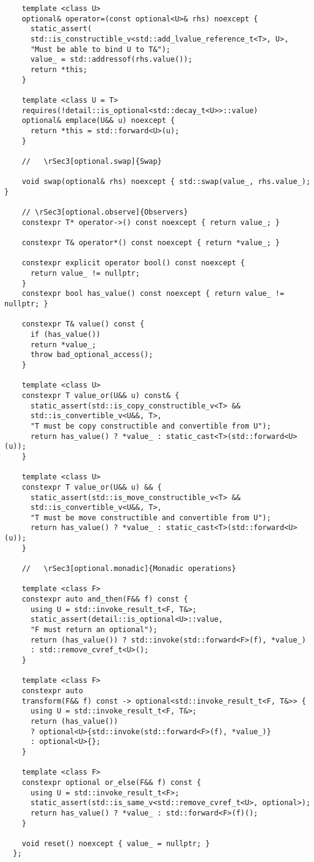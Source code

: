 \documentclass[a4paper,10pt,oneside,openany,final,article]{memoir}
\begin{document}
\begin{verbatim}
    template <class U>
    optional& operator=(const optional<U>& rhs) noexcept {
      static_assert(
      std::is_constructible_v<std::add_lvalue_reference_t<T>, U>,
      "Must be able to bind U to T&");
      value_ = std::addressof(rhs.value());
      return *this;
    }

    template <class U = T>
    requires(!detail::is_optional<std::decay_t<U>>::value)
    optional& emplace(U&& u) noexcept {
      return *this = std::forward<U>(u);
    }

    //   \rSec3[optional.swap]{Swap}

    void swap(optional& rhs) noexcept { std::swap(value_, rhs.value_); }

    // \rSec3[optional.observe]{Observers}
    constexpr T* operator->() const noexcept { return value_; }

    constexpr T& operator*() const noexcept { return *value_; }

    constexpr explicit operator bool() const noexcept {
      return value_ != nullptr;
    }
    constexpr bool has_value() const noexcept { return value_ != nullptr; }

    constexpr T& value() const {
      if (has_value())
      return *value_;
      throw bad_optional_access();
    }

    template <class U>
    constexpr T value_or(U&& u) const& {
      static_assert(std::is_copy_constructible_v<T> &&
      std::is_convertible_v<U&&, T>,
      "T must be copy constructible and convertible from U");
      return has_value() ? *value_ : static_cast<T>(std::forward<U>(u));
    }

    template <class U>
    constexpr T value_or(U&& u) && {
      static_assert(std::is_move_constructible_v<T> &&
      std::is_convertible_v<U&&, T>,
      "T must be move constructible and convertible from U");
      return has_value() ? *value_ : static_cast<T>(std::forward<U>(u));
    }

    //   \rSec3[optional.monadic]{Monadic operations}

    template <class F>
    constexpr auto and_then(F&& f) const {
      using U = std::invoke_result_t<F, T&>;
      static_assert(detail::is_optional<U>::value,
      "F must return an optional");
      return (has_value()) ? std::invoke(std::forward<F>(f), *value_)
      : std::remove_cvref_t<U>();
    }

    template <class F>
    constexpr auto
    transform(F&& f) const -> optional<std::invoke_result_t<F, T&>> {
      using U = std::invoke_result_t<F, T&>;
      return (has_value())
      ? optional<U>{std::invoke(std::forward<F>(f), *value_)}
      : optional<U>{};
    }

    template <class F>
    constexpr optional or_else(F&& f) const {
      using U = std::invoke_result_t<F>;
      static_assert(std::is_same_v<std::remove_cvref_t<U>, optional>);
      return has_value() ? *value_ : std::forward<F>(f)();
    }

    void reset() noexcept { value_ = nullptr; }
  };
\end{verbatim}
\end{document}
